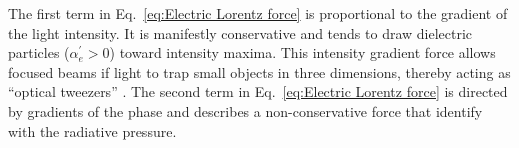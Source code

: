 The first term in Eq.~\eqref{eq:Electric Lorentz force} is proportional to the gradient of the light intensity. It is manifestly conservative and tends to draw dielectric particles ($\alpha _{e}^{\prime}>0$) toward intensity maxima. This intensity gradient force allows focused beams if light to trap small objects in three dimensions, thereby acting as ``optical tweezers'' \cite{Ashkin:86}. The second term in Eq.~\eqref{eq:Electric Lorentz force} is directed by gradients of the phase and describes a non-conservative force that identify with the radiative pressure.

